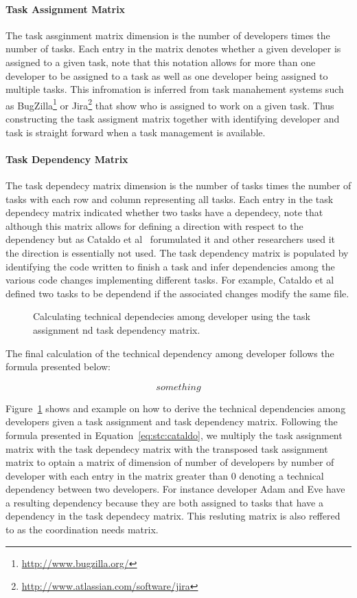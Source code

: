 \paragraph{Task Assignment Matrix}
The task assginment matrix dimension is the number of developers times the number of tasks.
Each entry in the matrix denotes whether a given developer is assigned to a given task, note that this notation allows for more than one developer to be assigned to a task as well as one developer being assigned to multiple tasks.
This infromation is inferred from task manahement systems such as BugZilla\footnote{\url{http://www.bugzilla.org/}} or Jira\footnote{\url{http://www.atlassian.com/software/jira}} that show who is assigned to work on a given task.
Thus constructing the task assigment matrix together with identifying developer and task is straight forward when a task management is available.

\paragraph{Task Dependency Matrix}
The task dependecy matrix dimension is the number of tasks times the number of tasks with each row and column representing all tasks.
Each entry in the task dependecy matrix indicated whether two tasks have a dependecy, note that although this matrix allows for defining a direction with respect to the dependency but as Cataldo et al~\cite{} forumulated it and other researchers used it~\cite{} the direction is essentially not used.
The task dependency matrix is populated by identifying the code written to finish a task and infer dependencies among the various code changes implementing different tasks.
For example, Cataldo et al~\cite{} defined two tasks to be dependend if the associated changes modify the same file. 

\begin{figure}[ht]
\centering
{}
\caption{Calculating technical dependecies among developer using the task assignment nd task dependency matrix.}
\label{chap:3:fig:example:stc:cataldo}
\end{figure}
The final calculation of the technical dependency among developer follows the formula presented below:

\begin{equation}
\label{eq:stc:cataldo}
something
\end{equation}

Figure~\ref{chap:3:fig:example:stc:cataldo} shows and example on how to derive the technical dependencies among developers given a task assignment and task dependency matrix.
Following the formula presented in Equation~\ref{eq:stc:cataldo}, we multiply the task assignment matrix with the task dependecy matrix with the transposed task assignment matrix to optain a matrix of dimension of number of developers by number of developer with each entry in the matrix greater than 0 denoting a technical dependency between two developers.
For instance developer Adam and Eve have a resulting dependency because they are both assigned to tasks that have a dependency in the task dependecy matrix. 
This resluting matrix is also reffered to as the coordination needs matrix.

